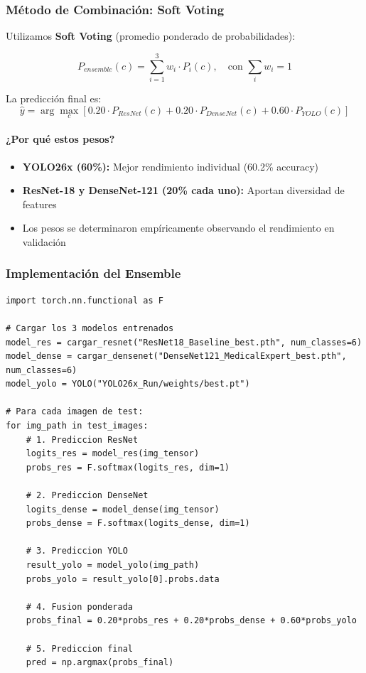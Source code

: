 \documentclass[12pt,a4paper]{article}
\begin{document}
\subsubsection{Método de Combinación: Soft Voting}

Utilizamos \textbf{Soft Voting} (promedio ponderado de probabilidades):

\begin{equation}
P_{ensemble}(c) = \sum_{i=1}^{3} w_i \cdot P_i(c), \quad \text{con } \sum_i w_i = 1
\end{equation}

La predicción final es:
\begin{equation}
\hat{y} = \arg\max_c \left[ 0.20 \cdot P_{ResNet}(c) + 0.20 \cdot P_{DenseNet}(c) + 0.60 \cdot P_{YOLO}(c) \right]
\end{equation}

\paragraph{¿Por qué estos pesos?}
\begin{itemize}
    \item \textbf{YOLO26x (60\%):} Mejor rendimiento individual (60.2\% accuracy)
    \item \textbf{ResNet-18 y DenseNet-121 (20\% cada uno):} Aportan diversidad de features
    \item Los pesos se determinaron empíricamente observando el rendimiento en validación
\end{itemize}

\subsubsection{Implementación del Ensemble}

\begin{lstlisting}[caption={Pseudocódigo de Inferencia del Ensemble}]
import torch.nn.functional as F

# Cargar los 3 modelos entrenados
model_res = cargar_resnet("ResNet18_Baseline_best.pth", num_classes=6)
model_dense = cargar_densenet("DenseNet121_MedicalExpert_best.pth", num_classes=6)
model_yolo = YOLO("YOLO26x_Run/weights/best.pt")

# Para cada imagen de test:
for img_path in test_images:
    # 1. Prediccion ResNet
    logits_res = model_res(img_tensor)
    probs_res = F.softmax(logits_res, dim=1)

    # 2. Prediccion DenseNet
    logits_dense = model_dense(img_tensor)
    probs_dense = F.softmax(logits_dense, dim=1)

    # 3. Prediccion YOLO
    result_yolo = model_yolo(img_path)
    probs_yolo = result_yolo[0].probs.data

    # 4. Fusion ponderada
    probs_final = 0.20*probs_res + 0.20*probs_dense + 0.60*probs_yolo

    # 5. Prediccion final
    pred = np.argmax(probs_final)
\end{lstlisting}
\end{document}
